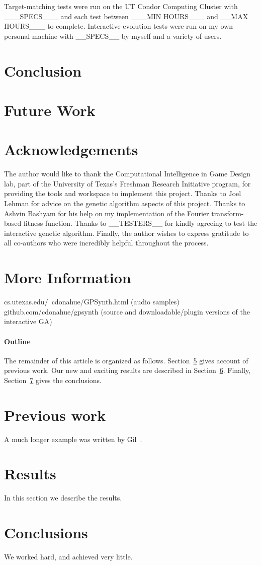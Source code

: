 \documentclass[12pt]{article}
\begin{document}
Target-matching tests were run on the UT Condor Computing Cluster with ___SPECS___ and each test between ___MIN HOURS___ and __MAX HOURS___ to complete. Interactive evolution tests were run on my own personal machine with __SPECS__ by myself and a variety of users.

\section{Conclusion}

\section{Future Work}

\section{Acknowledgements}
The author would like to thank the Computational Intelligence in Game Design lab, part of the University of Texas's Freshman Research Initiative program, for providing the tools and workspace to implement this project. Thanks to Joel Lehman for advice on the genetic algorithm aspects of this project. Thanks to Ashvin Bashyam for his help on my implementation of the Fourier transform-based fitness function. Thanks to __TESTERS__ for kindly agreeing to test the interactive genetic algorithm. Finally, the author wishes to express gratitude to all co-authors who were incredibly helpful throughout the process.

\section{More Information}
cs.utexas.edu/~cdonahue/GPSynth.html (audio samples)
github.com/cdonahue/gpsynth (source and downloadable/plugin versions of the interactive GA)

\paragraph{Outline}
The remainder of this article is organized as follows.
Section~\ref{previous work} gives account of previous work.
Our new and exciting results are described in Section~\ref{results}.
Finally, Section~\ref{conclusions} gives the conclusions.

\section{Previous work}\label{previous work}
A much longer \LaTeXe{} example was written by Gil~\cite{Gil:02}.

\section{Results}\label{results}
In this section we describe the results.

\section{Conclusions}\label{conclusions}
We worked hard, and achieved very little.



\end{document}
